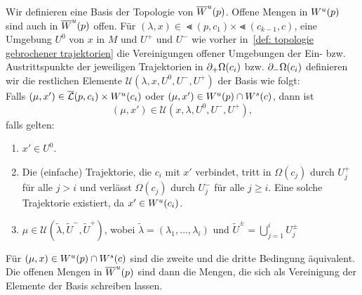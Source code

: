 \begin{definition}
    Wir definieren eine Basis der Topologie von ${ \overline{W}^u } (p)$. Offene Mengen in ${ W^u } (p)$ sind 
    auch in ${ \overline{W}^u } (p)$ offen. Für $(\lambda, x) \in \Lt (p, c_1) \times \Lt (c_{k - 1}, c)$,
    eine Umgebung $U^0$ von $x$ in $M$ und $U^+$ und $U^-$ wie vorher 
    in~\ref{def: topologie gebrochener trajektorien} die Vereinigungen offener Umgebungen der Ein-
    bzw. Austrittspunkte der jeweiligen Trajektorien in ${ \partial }_+ \Omega (c_i)$ bzw. 
    ${ \partial }_- \Omega (c_i)$ definieren wir die restlichen Elemente 
    $\mathcal{U}(\lambda, x, U^0, U^-, U^+)$ der Basis
    wie folgt: \\
    Falls $(\mu, x') \in {\overline{\mathcal{L}} }(p, c_i) \times { W^u } (c_i)$ oder $(\mu, x') \in W^u (p) \cap { W^s } (c)$, 
    dann ist \[ (\mu, x') \in \mathcal{U}(x, \lambda, U^0, U^-, U^+) , \]
    falls gelten:
    \begin{enumerate}
        \item $x' \in U^0$.
        \item Die (einfache) Trajektorie, die $c_i$ mit $x'$ verbindet, tritt in $\Omega (c_j)$ durch 
            $U^+_j$ für alle $j > i$ und verlässt $\Omega (c_j)$ durch $U^-_j$ für alle $j \geq i$.
            Eine solche Trajektorie existiert, da $x' \in { W^u } (c_i)$.
        \item $\mu \in \mathcal{U}(\tilde{\lambda}, \tilde{U}^-, \tilde{U}^+)$, wobei 
            $\tilde{\lambda} = (\lambda_1, \dots, \lambda_i)$ und 
            $\tilde{U}^{\pm} = \bigcup_{j = 1}^i U^{\pm}_j$
    \end{enumerate}
    Für $(\mu, x) \in { W^u }(p) \cap { W^s } (c)$ sind die zweite und die dritte Bedingung äquivalent.
    Die offenen Mengen in ${ \overline{W}^u } (p)$ sind dann die Mengen, die sich als Vereinigung der 
    Elemente der Basis schreiben lassen. 
\end{definition}

